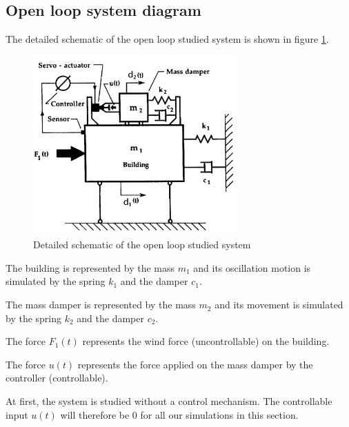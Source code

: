 \subsection{Open loop system diagram}
The detailed schematic of the open loop studied system is shown in figure \ref{fig:detailed_schematic}.
\begin{figure}[H]
    \centering
    \includegraphics[width=0.7\textwidth]{resources/pdf/open-loop-diagram.pdf}
    \caption{Detailed schematic of the open loop studied system \cite{YANG201718}}
    \label{fig:detailed_schematic}
\end{figure}
The building is represented by the mass $m_1$ and its oscillation motion is simulated by the spring $k_1$ and the damper $c_1$.\par
The mass damper is represented by the mass $m_2$ and its movement is simulated by the spring $k_2$ and the damper $c_2$.\par
The force $F_1(t)$ represents the wind force (uncontrollable) on the building.\par
The force $u(t)$ represents the force applied on the mass damper by the controller (controllable).\par
At first, the system is studied without a control mechanism. The controllable input $u(t)$ will therefore be \num{0} for all our simulations in this section.
